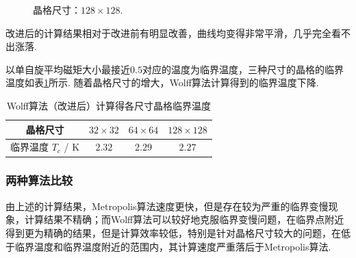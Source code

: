 \documentclass[UTF8,10pt,a4paper]{article}
\theoremstyle{Problem}
\theoremstyle{Solution}
\begin{document}
\begin{figure}[ht]
    \caption{晶格尺寸：$128\times 128$.}
    \label{128-128-Wolff-hybrid}
\end{figure}

改进后的计算结果相对于改进前有明显改善，曲线均变得非常平滑，几乎完全看不出涨落.

以单自旋平均磁矩大小最接近$0.5$对应的温度为临界温度，三种尺寸的晶格的临界温度如表\ref{Wolff-Tc}所示. 随着晶格尺寸的增大，Wolff算法计算得到的临界温度下降.

\begin{table}[ht]
    \centering
    \caption{Wolff算法（改进后）计算得各尺寸晶格临界温度}
    \label{Wolff-Tc}
    \begin{tabular}{c|ccc}
    晶格尺寸 & $32\times 32$ & $64\times 64$ & $128\times 128$ \\ \hline
    临界温度 $T_c$ / K & $2.32$ & $2.29$ & $2.27$
    \end{tabular}
\end{table}

\subsubsection{两种算法比较}
由上述的计算结果，Metropolis算法速度更快，但是存在较为严重的临界变慢现象，计算结果不精确；而Wolff算法可以较好地克服临界变慢问题，在临界点附近得到更为精确的结果，但是计算效率较低，特别是针对晶格尺寸较大的问题，在低于临界温度和临界温度附近的范围内，其计算速度严重落后于Metropolis算法.
\end{document}
